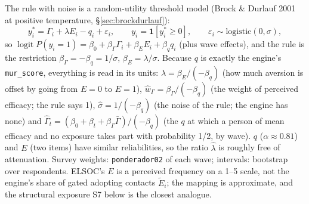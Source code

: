 \documentclass[11pt,a4paper]{article}
\newcommand{\Ee}{\tilde{E}}                 %
\newcommand{\code}[1]{\texttt{#1}}
\begin{document}
\noindent The rule with noise is a random-utility threshold model (Brock \& Durlauf 2001 at positive
temperature, \S\ref{sec:brockdurlauf}):
\[
y_i^* = \Gamma_i + \lambda E_i - q_i + \varepsilon_i, \qquad y_i = \mathbf 1[y_i^* \ge 0], \qquad
\varepsilon_i \sim \text{logistic}(0, \sigma),
\]
so $\operatorname{logit} P(y_i = 1) = \beta_0 + \beta_\Gamma \Gamma_i + \beta_E E_i + \beta_q q_i$ (plus wave
effects), and the rule is the restriction $\beta_\Gamma = -\beta_q = 1/\sigma$, $\beta_E = \lambda/\sigma$.
Because $q$ is exactly the engine's \code{mur\_score}, everything is read in its units:
$\hat\lambda = \beta_E/(-\beta_q)$ (how much aversion is offset by going from $E = 0$ to $E = 1$),
$\hat w_\Gamma = \beta_\Gamma/(-\beta_q)$ (the weight of perceived efficacy; the rule says 1),
$\hat\sigma = 1/(-\beta_q)$ (the noise of the rule; the engine has none) and
$\hat\Gamma_t = (\beta_0 + \beta_t + \beta_\Gamma\bar\Gamma)/(-\beta_q)$ (the $q$ at which a person of mean
efficacy and no exposure takes part with probability 1/2, by wave). $q$ ($\alpha \approx 0.81$) and $E$ (two
items) have similar reliabilities, so the ratio $\hat\lambda$ is roughly free of attenuation. Survey weights:
\code{ponderador02} of each wave; intervals: bootstrap over respondents. ELSOC's $E$ is a perceived frequency
on a 1--5 scale, not the engine's share of gated adopting contacts $\Ee_i$; the mapping is approximate, and
the structural exposure S7 below is the closest analogue.
\end{document}
